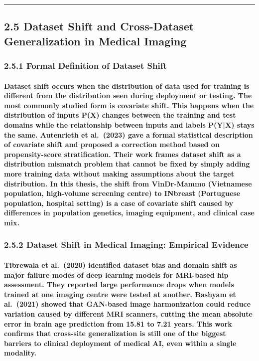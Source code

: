 \begin{center}\rule{0.5\linewidth}{0.5pt}\end{center}

\subsection{2.5 Dataset Shift and Cross-Dataset Generalization in
Medical
Imaging}\label{dataset-shift-and-cross-dataset-generalization-in-medical-imaging}

\subsubsection{2.5.1 Formal Definition of Dataset
Shift}\label{formal-definition-of-dataset-shift}

\paragraph{Dataset shift occurs when the distribution of data used for training is different from the distribution seen during deployment or testing. The most commonly studied form is covariate shift. This happens when the distribution of inputs P(X) changes between the training and test domains while the relationship between inputs and labels P(Y|X) stays the same. Autenrieth et al. (2023) gave a formal statistical description of covariate shift and proposed a correction method based on propensity-score stratification. Their work frames dataset shift as a distribution mismatch problem that cannot be fixed by simply adding more training data without making assumptions about the target distribution. In this thesis, the shift from VinDr-Mammo (Vietnamese population, high-volume screening centre) to INbreast (Portuguese population, hospital setting) is a case of covariate shift caused by differences in population genetics, imaging equipment, and clinical case mix.}

\subsubsection{2.5.2 Dataset Shift in Medical Imaging: Empirical
Evidence}\label{dataset-shift-in-medical-imaging-empirical-evidence}

\paragraph{Tibrewala et al. (2020) identified dataset bias and domain shift as major failure modes of deep learning models for MRI-based hip assessment. They reported large performance drops when models trained at one imaging centre were tested at another. Bashyam et al. (2021) showed that GAN-based image harmonization could reduce variation caused by different MRI scanners, cutting the mean absolute error in brain age prediction from 15.81 to 7.21 years. This work confirms that cross-site generalization is still one of the biggest barriers to clinical deployment of medical AI, even within a single modality.}

